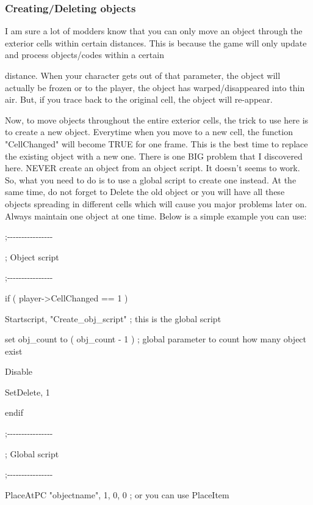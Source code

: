\hypertarget{creatingdeleting-objects}{%
\subsubsection{\texorpdfstring{Creating/Deleting objects
}{Creating/Deleting objects }}\label{creatingdeleting-objects}}

I am sure a lot of modders know that you can only move an object through
the exterior cells within certain distances. This is because the game
will only update and process objects/codes within a certain

distance. When your character gets out of that parameter, the object
will actually be frozen or to the player, the object has
warped/disappeared into thin air. But, if you trace back to the original
cell, the object will re-appear.

Now, to move objects throughout the entire exterior cells, the trick to
use here is to create a new object. Everytime when you move to a new
cell, the function "CellChanged" will become TRUE for one frame. This is
the best time to replace the existing object with a new one. There is
one BIG problem that I discovered here. NEVER create an object from an
object script. It doesn't seems to work. So, what you need to do is to
use a global script to create one instead. At the same time, do not
forget to Delete the old object or you will have all these objects
spreading in different cells which will cause you major problems later
on. Always maintain one object at one time. Below is a simple example
you can use:

;-\/-\/-\/-\/-\/-\/-\/-\/-\/-\/-\/-\/-\/-\/-\/-

; Object script

;-\/-\/-\/-\/-\/-\/-\/-\/-\/-\/-\/-\/-\/-\/-\/-

if ( player-\textgreater CellChanged == 1 )

Startscript, "Create\_obj\_script" ; this is the global script

set obj\_count to ( obj\_count - 1 ) ; global parameter to count how
many object exist

Disable

SetDelete, 1

endif

;-\/-\/-\/-\/-\/-\/-\/-\/-\/-\/-\/-\/-\/-\/-\/-

; Global script

;-\/-\/-\/-\/-\/-\/-\/-\/-\/-\/-\/-\/-\/-\/-\/-

PlaceAtPC "objectname", 1, 0, 0 ; or you can use PlaceItem

